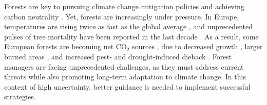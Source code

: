 \documentclass[11pt,letter]{article}
\begin{document}

Forests are key to pursuing climate change mitigation policies and achieving carbon neutrality  \citep{Korosuo2023, Hyyrynen2023}. Yet, forests are increasingly under pressure. In Europe, temperatures are rising twice as fast as the global average \citep{CCCS2024}, and unprecedented pulses of tree mortality  have been reported in the last decade \citep{Senf2020}. As a result, some European forests are becoming net CO$_2$ sources \citep{Hadden2016, Karelin2021}, due to decreased growth \citep{Hadden2016, Woude2023}, larger burned areas \citep{Carnicer2022, Kelly2024}, and increased pest- and drought-induced dieback \citep{Karelin2021, Cienciala2024, Latifovic2024}. Forest managers are facing unprecedented challenges, as they must address current threats while also promoting long-term adaptation to climate change. In this context of high uncertainty, better guidance  is needed to implement successful strategies.
\end{document}
